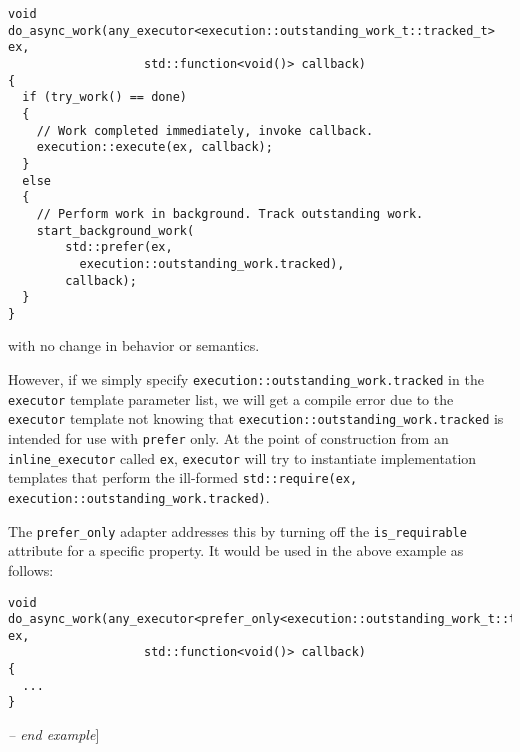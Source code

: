 \documentclass[a4paper,12pt,notitlepage,twoside,openright]{article}
\begin{document}
\begin{verbatim}
void do_async_work(any_executor<execution::outstanding_work_t::tracked_t> ex,
                   std::function<void()> callback)
{
  if (try_work() == done)
  {
    // Work completed immediately, invoke callback.
    execution::execute(ex, callback);
  }
  else
  {
    // Perform work in background. Track outstanding work.
    start_background_work(
        std::prefer(ex,
          execution::outstanding_work.tracked),
        callback);
  }
}
\end{verbatim}

with no change in behavior or semantics.

However, if we simply specify
\texttt{execution::outstanding_work.tracked} in the
\texttt{executor} template parameter list, we will get a
compile error due to the \texttt{executor} template not
knowing that \texttt{execution::outstanding_work.tracked} is
intended for use with \texttt{prefer} only. At the point of
construction from an \texttt{inline_executor} called
\texttt{ex}, \texttt{executor} will try to
instantiate implementation templates that perform the ill-formed
\texttt{std::require(ex, execution::outstanding_work.tracked)}.

The \texttt{prefer_only} adapter addresses this by turning
off the \texttt{is_requirable} attribute for a specific
property. It would be used in the above example as follows:

\begin{verbatim}
void do_async_work(any_executor<prefer_only<execution::outstanding_work_t::tracked_t>> ex,
                   std::function<void()> callback)
{
  ...
}
\end{verbatim}

\emph{-- end example}{]}
\end{document}
